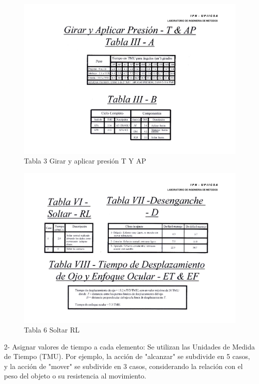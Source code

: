         \begin{figure}[H]
            \centering
            \includegraphics[trim = {1mm 1mm 1mm 26mm},clip,scale=0.3]{34/img/tablaGirar.pdf}
            \caption{Tabla 3 Girar y aplicar presión T Y AP}
            \label{fig:tablaGirar}
        \end{figure}
    
        \begin{figure}[H]
            \centering
            \includegraphics[trim = {1mm 95mm 200mm 26mm},clip,scale=0.4]{34/img/tablaSoltar.pdf}
            \caption{Tabla 6 Soltar RL}
            \label{fig:tablaSoltar}
        \end{figure}
        
        
    
    2- Asignar valores de tiempo a cada elemento: Se utilizan las Unidades de Medida de Tiempo (TMU). Por ejemplo, la acción de "alcanzar" se subdivide en 5 casos, y la acción de "mover" se subdivide en 3 casos, considerando la relación con el peso del objeto o su resistencia al movimiento.
    

